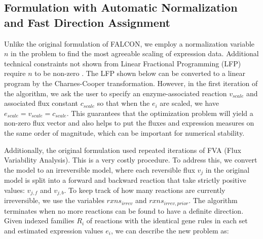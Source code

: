 \documentclass[phd,tocprelim]{cornell}
\theoremstyle{break}
\theoremstyle{empty}
\begin{document}
\subsection{Formulation with Automatic Normalization and Fast Direction Assignment}
Unlike the original formulation of FALCON, we employ a normalization variable $n$ in the problem
to find the most agreeable scaling of expression data. Additional technical constraints not shown
from Linear Fractional Programming (LFP) require $n$ to be non-zero \cite{Boyd2004}. The
LFP shown below can be converted to a linear program by the Charnes-Cooper transformation.
However, in the first iteration of the algorithm, we ask the user to
specify an enzyme-associated reaction $v_{scale}$ and associated flux
constant $c_{scale}$ so that when the $e_i$ are scaled, we have
$e_{scale} = v_{scale} = c_{scale}$. This guarantees that the
optimization problem will yield a non-zero flux vector and also helps
to put the fluxes and expression measures on the same order of
magnitude, which can be important for numerical stability.

Additionally, the original formulation
used repeated iterations of FVA (Flux Variability Analysis). This is a very costly procedure. 
To address this, we convert the model to an irreversible model, where each reversible flux $v_j$
in the original model is split into a forward and backward reaction that take strictly positive
values: $v_{j,f}$ and $v_{j,b}$. To keep track of how many reactions
are currently irreversible, we use the variables $rxns_{irrev}$ and
$rxns_{irrev,prior}$. The algorithm terminates when no more reactions
can be found to have a definite direction.  Given indexed families
$R_i$ of reactions with the identical gene rules in each set and
estimated expression values $e_i$, we can describe the new problem as:
\end{document}
